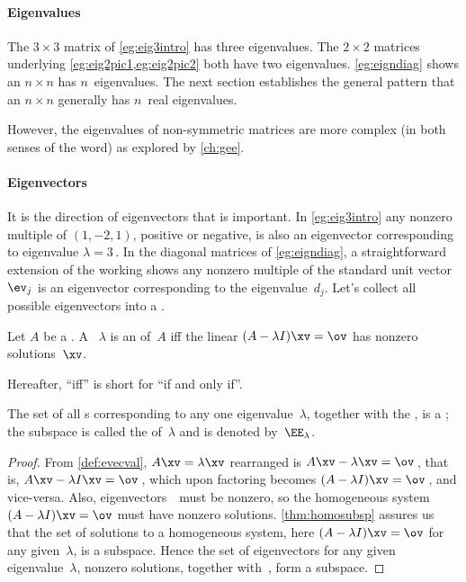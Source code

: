 \paragraph{Eigenvalues}
The \(3\times 3\) matrix of \cref{eg:eig3intro} has three eigenvalues.
The \(2\times2\) matrices underlying \cref{eg:eig2pic1,eg:eig2pic2} both have two eigenvalues.
\cref{eg:eigndiag} shows an \(n\times n\)  has \(n\)~eigenvalues.
The next section establishes the general pattern that an \(n\times n\) \emph{} generally has \(n\)~real eigenvalues.

However, the eigenvalues of non-symmetric matrices are more complex (in both senses of the word) as explored by \cref{ch:gee}.

\paragraph{Eigenvectors}
It is the direction of eigenvectors that is important.
In \cref{eg:eig3intro} any nonzero multiple of \((1,-2,1)\), positive or negative, is also an eigenvector corresponding to eigenvalue \(\lambda=3\)\,.
In the diagonal matrices of \cref{eg:eigndiag}, a straightforward extension of the working shows any nonzero multiple of the standard unit vector~\(\ev_j\) is an eigenvector corresponding to the eigenvalue~\(d_j\).
Let's collect all possible eigenvectors into a . 


\begin{theorem} \label{thm:espacedef} 
Let \(A\) be a . 
A ~\(\lambda\) is an  of~\(A\) iff the  linear  \((A-\lambda I)\xv=\ov\) has nonzero solutions~\(\xv\).  
\begin{aside}
Hereafter, ``iff'' is short for ``if and only if''.
\end{aside}%
The set of all s corresponding to any one eigenvalue~\(\lambda\), together with the , is a ; the subspace is called the  of~\(\lambda\) and is denoted by~\(\EE_\lambda\).
\end{theorem}



\begin{proof} 
From \cref{def:evecval},  \(A\xv=\lambda\xv\)  rearranged is \(A\xv-\lambda\xv=\ov\)\,, that is, \(A\xv-\lambda I\xv=\ov\)\,, which upon factoring becomes \((A-\lambda I)\xv=\ov\)\,, and vice-versa.  
Also, eigenvectors~\xv\ must be nonzero, so the homogeneous system \((A-\lambda I)\xv=\ov\) must have nonzero solutions.
\cref{thm:homosubsp} assures us that the set of solutions to a homogeneous system, here \((A-\lambda I)\xv=\ov\) for any given~\(\lambda\), is a subspace. 
Hence the set of eigenvectors for any given eigenvalue~\(\lambda\), nonzero solutions, together with~\ov, form a subspace.
\end{proof}


